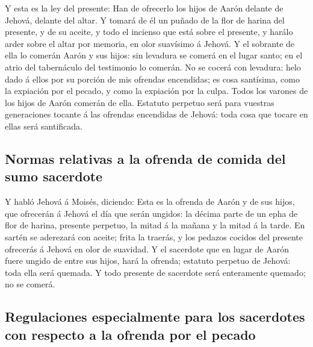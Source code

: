  Y esta es la ley del presente: Han de ofrecerlo los
hijos de Aarón delante de Jehová, delante del altar.  Y
tomará de él un puñado de la flor de harina del presente, y de su
aceite, y todo el incienso que está sobre el presente, y harálo arder
sobre el altar por memoria, en olor suavísimo á Jehová. 
Y el sobrante de ella lo comerán Aarón y sus hijos: sin levadura se
comerá en el lugar santo; en el atrio del tabernáculo del testimonio lo
comerán.  No se cocerá con levadura: helo dado á ellos
por su porción de mis ofrendas encendidas; es cosa santísima, como la
expiación por el pecado, y como la expiación por la culpa.
 Todos los varones de los hijos de Aarón comerán de ella.
Estatuto perpetuo será para vuestras generaciones tocante á las ofrendas
encendidas de Jehová: toda cosa que tocare en ellas será santificada.

\hypertarget{normas-relativas-a-la-ofrenda-de-comida-del-sumo-sacerdote}{%
\subsection{Normas relativas a la ofrenda de comida del sumo
sacerdote}\label{normas-relativas-a-la-ofrenda-de-comida-del-sumo-sacerdote}}

 Y habló Jehová á Moisés, diciendo:  Esta
es la ofrenda de Aarón y de sus hijos, que ofrecerán á Jehová el día que
serán ungidos: la décima parte de un epha de flor de harina, presente
perpetuo, la mitad á la mañana y la mitad á la tarde.  En
sartén se aderezará con aceite; frita la traerás, y los pedazos cocidos
del presente ofrecerás á Jehová en olor de suavidad.  Y
el sacerdote que en lugar de Aarón fuere ungido de entre sus hijos, hará
la ofrenda; estatuto perpetuo de Jehová: toda ella será quemada.
 Y todo presente de sacerdote será enteramente quemado;
no se comerá.

\hypertarget{regulaciones-especialmente-para-los-sacerdotes-con-respecto-a-la-ofrenda-por-el-pecado}{%
\subsection{Regulaciones especialmente para los sacerdotes con respecto
a la ofrenda por el
pecado}\label{regulaciones-especialmente-para-los-sacerdotes-con-respecto-a-la-ofrenda-por-el-pecado}}

